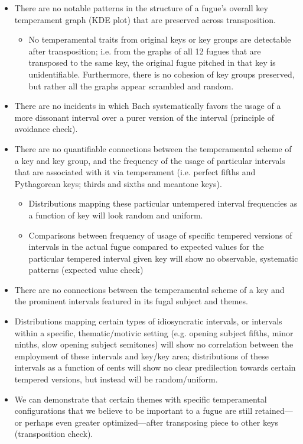 \begin{itemize}
\tightlist
\item
  There are no notable patterns in the structure of a fugue's overall
  key temperament graph (KDE plot) that are preserved across
  transposition.

  \begin{itemize}
  \tightlist
  \item
    No temperamental traits from original keys or key groups are
    detectable after transposition; i.e. from the graphs of all 12
    fugues that are transposed to the same key, the original fugue
    pitched in that key is unidentifiable. Furthermore, there is no
    cohesion of key groups preserved, but rather all the graphs appear
    scrambled and random.
  \end{itemize}
\item
  There are no incidents in which Bach systematically favors the usage
  of a more dissonant interval over a purer version of the interval
  (principle of avoidance check).
\item
  There are no quantifiable connections between the temperamental scheme
  of a key and key group, and the frequency of the usage of particular
  intervals that are associated with it via temperament (i.e. perfect
  fifths and Pythagorean keys; thirds and sixths and meantone keys).

  \begin{itemize}
  \tightlist
  \item
    Distributions mapping these particular untempered interval
    frequencies as a function of key will look random and uniform.
  \item
    Comparisons between frequency of usage of specific tempered versions
    of intervals in the actual fugue compared to expected values for the
    particular tempered interval given key will show no observable,
    systematic patterns (expected value check)\\
  \end{itemize}
\item
  There are no connections between the temperamental scheme of a key and
  the prominent intervals featured in its fugal subject and themes.
\item
  Distributions mapping certain types of idiosyncratic intervals, or
  intervals within a specific, thematic/motivic setting (e.g. opening
  subject fifths, minor ninths, slow opening subject semitones) will
  show no correlation between the employment of these intervals and
  key/key area; distributions of these intervals as a function of cents
  will show no clear predilection towards certain tempered versions, but
  instead will be random/uniform.
\item
  We can demonstrate that certain themes with specific temperamental
  configurations that we believe to be important to a fugue are still
  retained---or perhaps even greater optimized---after
  transposing piece to other keys (transposition check).
\end{itemize}

